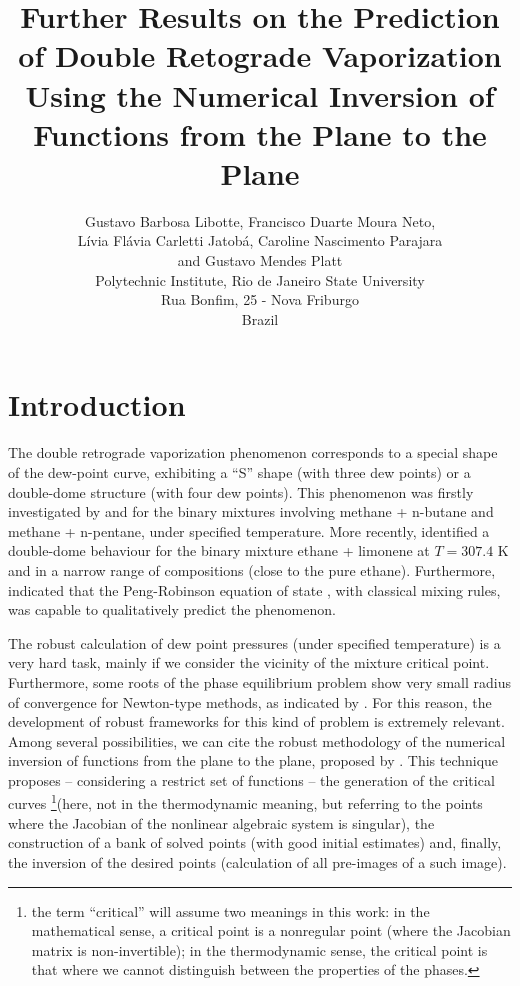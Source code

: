 \documentclass{article}
\title{Further Results on the Prediction of Double Retograde Vaporization Using the Numerical Inversion of Functions from the Plane to the Plane}
\author{Gustavo Barbosa Libotte, Francisco Duarte Moura Neto,\\
L\'{i}via Fl\'{a}via Carletti Jatob\'{a}, Caroline Nascimento Parajara \\ and Gustavo Mendes Platt\\
  \small Polytechnic Institute, Rio de Janeiro State University\\
  \small Rua Bonfim, 25 - Nova Friburgo\\
  \small Brazil
}
\theoremstyle{definition}
\theoremstyle{remark}
\begin{document}
\maketitle


\section{Introduction}

The double retrograde vaporization phenomenon corresponds to a special shape of the dew-point curve, exhibiting a ``S'' shape (with three dew points) or a double-dome structure (with four dew points). This phenomenon was firstly investigated by \cite{chen_1} and \cite{chen_2} for the binary mixtures involving methane + n-butane and methane + n-pentane, under specified temperature. More recently, \cite{raeissi_1} identified a double-dome behaviour for the binary mixture ethane + limonene at $T = 307.4$ K and in a narrow range of compositions (close to the pure ethane). Furthermore, \cite{raeissi_2} indicated that the Peng-Robinson equation of state \cite{peng_robinson}, with classical mixing rules, was capable to qualitatively predict the phenomenon.

The robust calculation of dew point pressures (under specified temperature) is a very hard task, mainly if we consider the vicinity of the mixture critical point. Furthermore, some roots of the phase equilibrium problem show very small radius of convergence for Newton-type methods, as indicated by \cite{jnsa}. For this reason, the development of robust frameworks for this kind of problem is extremely relevant. Among several possibilities, we can cite the robust methodology of the numerical inversion of functions from the plane to the plane, proposed by \cite{malta}. This technique \cite{malta} proposes -- considering a restrict set of functions -- the generation of the critical curves \footnote{the term ``critical'' will assume two meanings in this work: in the mathematical sense, a critical point is a nonregular point (where the Jacobian matrix is non-invertible); in the thermodynamic sense, the critical point is that where we cannot distinguish between the properties of the phases.}(here, not in the thermodynamic meaning, but referring to the points where the Jacobian of the nonlinear algebraic system is singular), the construction of a bank of solved points (with good initial estimates) and, finally, the inversion of the desired points (calculation of all pre-images of a such image).
\end{document}
